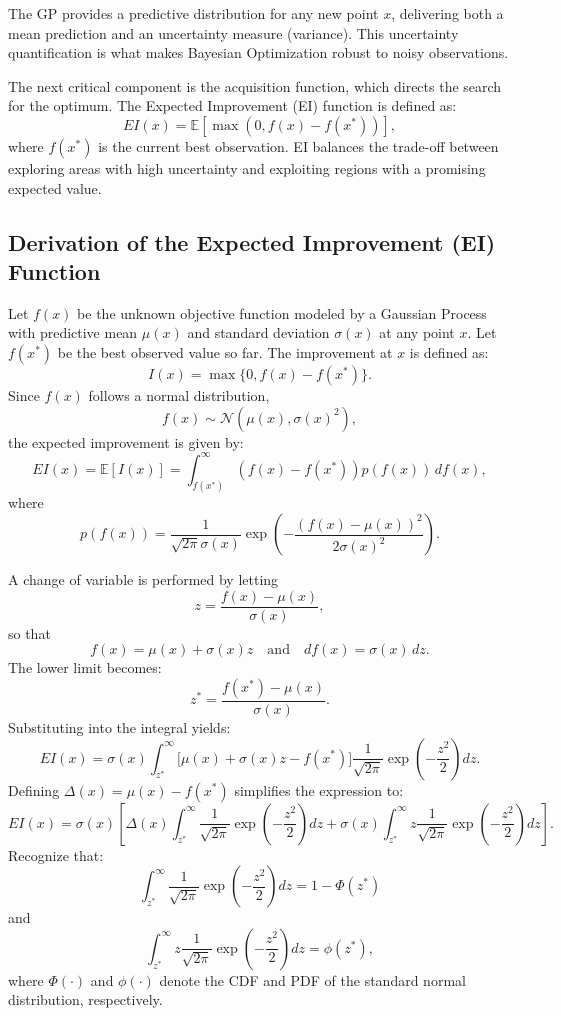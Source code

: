 \documentclass[a4paper,12pt]{article}
\begin{document}
The GP provides a predictive distribution for any new point \( x \), delivering
both a mean prediction and an uncertainty measure (variance). This uncertainty
quantification is what makes Bayesian Optimization robust to noisy observations.

The next critical component is the acquisition function, which directs the search
for the optimum. The Expected Improvement (EI) function is defined as:
\[
EI(x) = \mathbb{E}\left[\max\left(0, f(x) - f(x^*)\right)\right],
\]
where \( f(x^*) \) is the current best observation. EI balances the trade-off
between exploring areas with high uncertainty and exploiting regions with a
promising expected value.

\subsection{Derivation of the Expected Improvement (EI) Function}
Let \( f(x) \) be the unknown objective function modeled by a Gaussian Process
with predictive mean \( \mu(x) \) and standard deviation \( \sigma(x) \) at any
point \( x \). Let \( f(x^*) \) be the best observed value so far. The improvement
at \( x \) is defined as:
\[
I(x) = \max\{0, f(x) - f(x^*)\}.
\]
Since \( f(x) \) follows a normal distribution,
\[
f(x) \sim \mathcal{N}(\mu(x), \sigma(x)^2),
\]
the expected improvement is given by:
\[
EI(x) = \mathbb{E}[I(x)] = \int_{f(x^*)}^{\infty} \left( f(x) - f(x^*) \right) p(f(x)) \, df(x),
\]
where
\[
p(f(x)) = \frac{1}{\sqrt{2\pi}\sigma(x)} \exp\left( -\frac{(f(x) - \mu(x))^2}{2\sigma(x)^2} \right).
\]

A change of variable is performed by letting
\[
z = \frac{f(x) - \mu(x)}{\sigma(x)},
\]
so that
\[
f(x) = \mu(x) + \sigma(x)z \quad \text{and} \quad df(x) = \sigma(x) \, dz.
\]
The lower limit becomes:
\[
z^* = \frac{f(x^*) - \mu(x)}{\sigma(x)}.
\]
Substituting into the integral yields:
\[
EI(x) = \sigma(x) \int_{z^*}^{\infty} \Big[\mu(x) + \sigma(x)z - f(x^*)\Big] \frac{1}{\sqrt{2\pi}} \exp\left( -\frac{z^2}{2} \right) dz.
\]
Defining \( \Delta(x) = \mu(x) - f(x^*) \) simplifies the expression to:
\[
EI(x) = \sigma(x) \left[ \Delta(x) \int_{z^*}^{\infty} \frac{1}{\sqrt{2\pi}} \exp\left( -\frac{z^2}{2} \right) dz + \sigma(x) \int_{z^*}^{\infty} z \frac{1}{\sqrt{2\pi}} \exp\left( -\frac{z^2}{2} \right) dz \right].
\]
Recognize that:
\[
\int_{z^*}^{\infty} \frac{1}{\sqrt{2\pi}} \exp\left( -\frac{z^2}{2} \right) dz = 1 - \Phi(z^*)
\]
and
\[
\int_{z^*}^{\infty} z \frac{1}{\sqrt{2\pi}} \exp\left( -\frac{z^2}{2} \right) dz = \phi(z^*),
\]
where \( \Phi(\cdot) \) and \( \phi(\cdot) \) denote the CDF and PDF of the
standard normal distribution, respectively.
\end{document}
